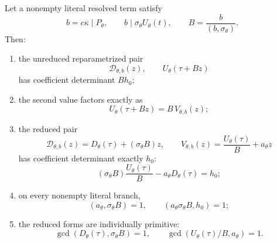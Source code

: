 \begin{theorem}
\label{thm:content-progression-determinant}
Let a nonempty literal resolved term satisfy
\[
 b=c\kappa\mid P_\theta,\qquad
 b\mid\sigma_\theta U_\theta(t),
\qquad
 B=\frac b{(b,\sigma_\theta)}.
\]
Then:
\begin{enumerate}[label=(\roman*),leftmargin=2.2em]
\item the unreduced reparametrized pair
\[
 \mathcal D_{\theta,b}(z),\qquad
 U_\theta(\tau+Bz)
\]
has coefficient determinant \(Bh_0\);
\item the second value factors exactly as
\[
 U_\theta(\tau+Bz)=B\,V_{\theta,b}(z);
\]
\item the reduced pair
\[
 \mathcal D_{\theta,b}(z)
 =
 D_\theta(\tau)+(\sigma_\theta B)z,\qquad
 V_{\theta,b}(z)
 =
 \frac{U_\theta(\tau)}B+a_\theta z
\]
has coefficient determinant exactly \(h_0\):
\begin{equation}
 \boxed{
 (\sigma_\theta B)\frac{U_\theta(\tau)}B
 -
 a_\theta D_\theta(\tau)
 =
 h_0;}
\label{eq:det-preserved}
\end{equation}
\item on every nonempty literal branch,
\begin{equation}
 (a_\theta,\sigma_\theta B)=1,\qquad
 (a_\theta\sigma_\theta B,h_0)=1;
\label{eq:det-reduced-slope-primitivity}
\end{equation}
\item the reduced forms are individually primitive:
\begin{equation}
 \gcd(D_\theta(\tau),\sigma_\theta B)=1,\qquad
 \gcd(U_\theta(\tau)/B,a_\theta)=1.
\label{eq:det-reduced-form-primitivity}
\end{equation}
\end{enumerate}
\end{theorem}

